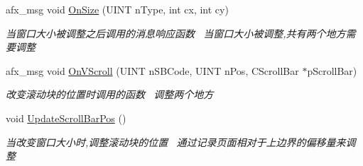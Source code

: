 \begin{DoxyCompactItemize}
\begin{DoxyCompactList}
\end{DoxyCompactList}\item 
afx\+\_\+msg void \hyperlink{class_c_main_frame_adf171bf1f2c6f10cc85dbe8db3fc93f7}{On\+Size} (U\+I\+NT n\+Type, int cx, int cy)
\begin{DoxyCompactList}\small\item\em 当窗口大小被调整之后调用的消息响应函数~\newline
当窗口大小被调整,共有两个地方需要调整~\newline
\end{DoxyCompactList}\item 
afx\+\_\+msg void \hyperlink{class_c_main_frame_a969c7e78dee0c54e7bcbe2ab9c901cc2}{On\+V\+Scroll} (U\+I\+NT n\+S\+B\+Code, U\+I\+NT n\+Pos, C\+Scroll\+Bar $\ast$p\+Scroll\+Bar)
\begin{DoxyCompactList}\small\item\em 改变滚动块的位置时调用的函数~\newline
调整两个地方~\newline
\end{DoxyCompactList}\item 
void \hyperlink{class_c_main_frame_a4f7c9f6d9aeae93045c5dd2047ccebf1}{Update\+Scroll\+Bar\+Pos} ()
\begin{DoxyCompactList}\small\item\em 当改变窗口大小时,调整滚动块的位置~\newline
通过记录页面相对于上边界的偏移量来调整 \end{DoxyCompactList}\end{DoxyCompactItemize}
